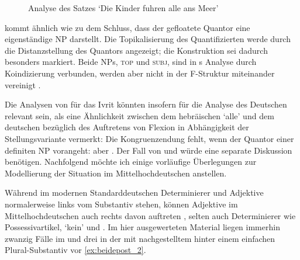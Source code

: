 \begin{figure}
	\caption{Analyse des Satzes  `Die Kinder
		fuhren alle ans Meer'}
	\label{fig:hebrqf}
\end{figure}

\citet[533--534]{spector2009} kommt ähnlich wie \citet[29]{pittner1995} zu dem
Schluss, dass der gefloatete Quantor eine eigenständige NP darstellt. Die
Topikalisierung des Quantifizierten werde durch die Distanzstellung des
Quantors angezeigt; die Konstruktion sei dadurch besonders markiert. Beide NPs,
\textsc{top} und \textsc{subj}, sind in \citeauthor{spector2009}s Analyse durch
Koindizierung verbunden, werden aber nicht in der F-Struktur miteinander
vereinigt \autocite[vgl.][99]{bresnanetal2016}.

Die Analysen von \citet{shlonsky1991,spector2009} für das Ivrit könnten
insofern für die Analyse des Deutschen relevant sein, als
\citet[179]{merchant1996} eine Ähnlichkeit zwischen dem hebräischen 
`alle' und dem deutschen  bezüglich des Auftretens von Flexion in
Abhängigkeit der Stellungsvariante vermerkt: Die Kongruenzendung fehlt, wenn
der Quantor einer definiten NP vorangeht:  aber . Der
Fall von  und  würde eine separate Diskussion
benötigen. Nachfolgend möchte ich einige vorläufige Überlegungen zur
Modellierung der Situation im Mittelhochdeutschen anstellen.

Während im modernen Standarddeutschen Determinierer und Adjektive normalerweise
links vom Substantiv stehen, können Adjektive im Mittelhochdeutschen
auch rechts davon auftreten \autocite[185--186, 237--243]{ksw2}, selten auch
Determinierer wie Possessivartikel,  `kein' und 
\autocite[515--517, 551--552, 623--624]{ksw2}. Im hier ausgewerteten Material
liegen immerhin zwanzig Fälle im \CAO{} und drei in der \KC{}
mit nachgestelltem  hinter einem einfachen Plural-Substantiv vor
\cref{ex:beidepost_2}.


